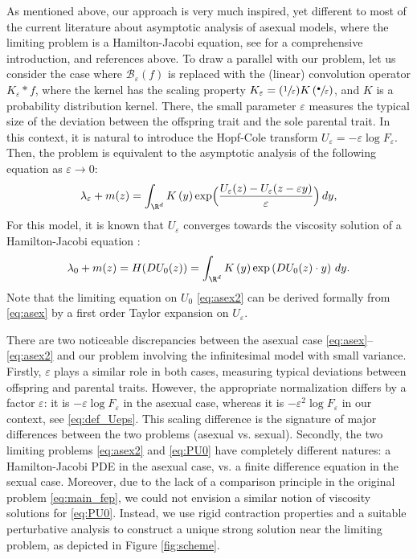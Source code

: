 \documentclass[10pt]{amsart}
\let\mathcal\mathscr
\newcommand{\sbullet}{{\scriptscriptstyle\bullet}}
\newcommand{\csbullet}{{\raisebox{1pt}{$\sbullet$}}}
\newcommand{\Psfrac}[2]{(\sfrac{#1}{#2})}
\newcommand{\cB}{\mathcal{B}}
\theoremstyle{plain}
\theoremstyle{definition}
\let\eps\varepsilon
\begin{document}
As mentioned above,
our approach is very much inspired, yet different to most of the current literature about asymptotic analysis of asexual models, where the limiting problem is a Hamilton-Jacobi equation, see \cite{perthame-book} for a comprehensive introduction, and references above. To draw a parallel with our problem, let us consider the case where $\cB_\eps(f)$ is replaced with the (linear) convolution operator $ K_\eps*f$, where the kernel has the scaling property $ K_\eps = \Psfrac1\eps K\left (\sfrac{\csbullet}{\eps}\right)$, and $K$ is a probability distribution kernel. There, the small parameter $\eps$ measures the typical size of the deviation between the offspring trait and the sole parental trait. In this context, it is natural to introduce the Hopf-Cole transform $U_\eps = - \eps \log F_\eps$. Then, the problem is equivalent to the asymptotic analysis of the following equation as $\eps\to0$:
\begin{equation}\label{eq:asex}
\lambda_\eps + m(z) = \int_{\R^d} K\left(y\right) \exp\Bigl(\dfrac{U_\eps(z)-U_\eps(z-\eps y)}\eps \Bigr)\, dy,
\end{equation}
For this model, it is known that $U_\eps$ converges towards the viscosity solution of a Hamilton-Jacobi equation \cite{mirrahimiconcentration}:
\begin{equation}\label{eq:asex2}
\lambda_0 + m(z) = H(D U_0(z)) = \int_{\R^d} K\left(y\right) \exp\left(D U_0(z)\cdot y \right)\, dy.
\end{equation}
Note that the limiting equation on $U_0$ \eqref{eq:asex2} can be derived formally from \eqref{eq:asex} by a first order Taylor expansion on $U_\eps$.

There are two noticeable discrepancies between the asexual case \eqref{eq:asex}--\eqref{eq:asex2} and our problem involving the infinitesimal model with small variance. Firstly, $\eps$ plays a similar role in both cases, \ie measuring typical deviations between offspring and parental traits. However, the appropriate normalization differs by a factor $\eps$: it is $-\eps \log F_\eps$ in the asexual case, whereas it is $-\eps^2 \log F_\eps$ in our context, see \eqref{eq:def_Ueps}. This scaling difference is the signature of major differences between the two problems (asexual vs. sexual). Secondly, the two limiting problems \eqref{eq:asex2} and \eqref{eq:PU0} have completely different natures: a Hamilton-Jacobi PDE in the asexual case, vs. a finite difference equation in the sexual case. Moreover, due to the lack of a comparison principle in the original problem \eqref{eq:main_fep}, we could not envision a similar notion of viscosity solutions for \eqref{eq:PU0}. Instead, we use rigid contraction properties and a
suitable perturbative analysis to construct a unique strong solution near the limiting problem, as depicted in Figure \ref{fig:scheme}.
\end{document}
